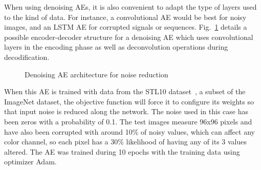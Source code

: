 \documentclass[
	fontsize=11pt, %
	twoside=false, %
	open=any, %
	secnumdepth=1, %
]{kaobook}
\begin{document}
When using denoising AEs, it is also convenient to adapt the type of layers used to the kind of data. For instance, a convolutional AE would be best for noisy images, and an LSTM AE for corrupted signals or sequences. Fig.~\ref{fig:graph-denoising} details a possible encoder-decoder structure for a denoising AE which uses convolutional layers in the encoding phase as well as deconvolution operations during decodification.

\begin{figure}[ht]
    \centering\small
    \caption{Denoising AE architecture for noise reduction}
    \label{fig:graph-denoising}
\end{figure}

When this AE is trained with data from the STL10 dataset~\cite{stl10}, a subset of the ImageNet dataset, the objective function will force it to configure its weights so that input noise is reduced along the network. The noise used in this case has been zeros with a probability of 0.1. The test images measure 96x96 pixels and have also been corrupted with around 10\% of noisy values, which can affect any color channel, so each pixel has a 30\% likelihood of having any of its 3 values altered. The AE was trained during 10 epochs with the training data using optimizer Adam. 
\end{document}
